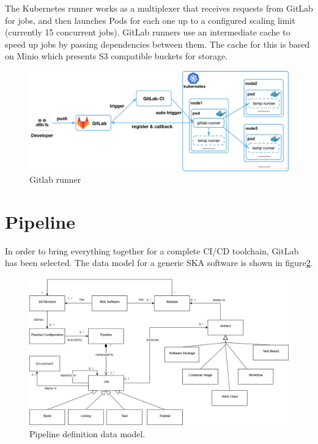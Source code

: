 \documentclass[a4paper,
               keeplastbox,   %
               ]{jacow}
\begin{document}
The Kubernetes runner \cite{gitlabrunner} works as a multiplexer that receives requests from GitLab for jobs, and then launches Pods for each one up to a configured scaling limit (currently 15 concurrent jobs). GitLab runners use an intermediate cache to speed up jobs by passing dependencies between them. The cache for this is based on Minio\cite{minio} which presents S3\cite{s3} compatible buckets for storage.

\begin{figure}[!htb]
	\centering
	\includegraphics*[width=0.8\columnwidth]{gitlab-runner}
	\caption{Gitlab runner}
	\label{fig:gitlab-runner}
\end{figure}


\section{Pipeline}

In order to bring everything together for a complete CI/CD toolchain, GitLab\cite{gitlab} has been selected. The data model for a generic SKA software is shown in figure\ref{fig:pipelinedatamodel}.

\begin{figure}[!htb]
   \centering
   \includegraphics*[width=0.8\columnwidth]{dataEntity}
   \caption{Pipeline definition data model.}
   \label{fig:pipelinedatamodel}
\end{figure}
\end{document}
